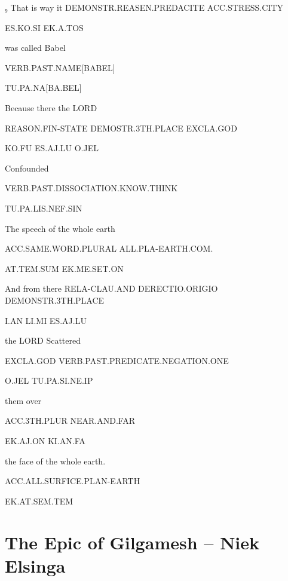  

₉ That is way 				it 			DEMONSTR.REASEN.PREDACITE	ACC.STRESS.CITY	 

ES.KO.SI				EK.A.TOS		 

 

was called Babel 

VERB.PAST.NAME[BABEL] 

TU.PA.NA[BA.BEL] 

  

Because 		there 				the LORD  

REASON.FIN-STATE          DEMOSTR.3TH.PLACE		EXCLA.GOD 

KO.FU			ES.AJ.LU			O.JEL 

  

Confounded 

VERB.PAST.DISSOCIATION.KNOW.THINK	 

TU.PA.LIS.NEF.SIN                                               			 

 

The speech			 of the whole earth 

ACC.SAME.WORD.PLURAL 	ALL.PLA-EARTH.COM. 

AT.TEM.SUM			EK.ME.SET.ON 

 

And 			from 			there 		RELA-CLAU.AND	DERECTIO.ORIGIO      DEMONSTR.3TH.PLACE 

I.AN			LI.MI			ES.AJ.LU			 

the LORD	Scattered 

EXCLA.GOD	VERB.PAST.PREDICATE.NEGATION.ONE 

O.JEL		TU.PA.SI.NE.IP    

 

 them 		over 		 

ACC.3TH.PLUR	NEAR.AND.FAR	 

EK.AJ.ON	KI.AN.FA               

  

the face of the whole earth. 

ACC.ALL.SURFICE.PLAN-EARTH 

EK.AT.SEM.TEM 



\section{The Epic of Gilgamesh -- {\small Niek Elsinga}}




